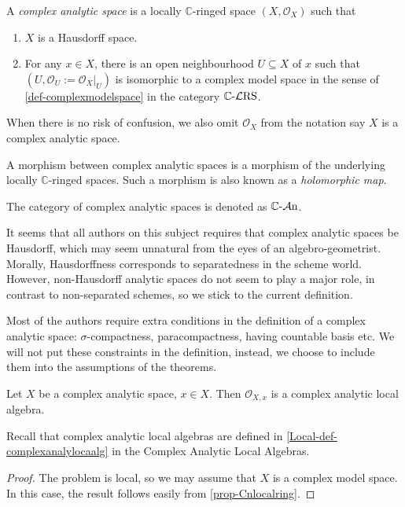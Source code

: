\begin{definition}\label{def-complexanalyticspace}
    A \emph{complex analytic space} is a locally $\mathbb{C}$-ringed space $(X,\mathcal{O}_X)$ such that 
    \begin{enumerate}
        \item $X$ is a Hausdorff space.
        \item For any $x\in X$, there is an open neighbourhood $U\subseteq X$ of $x$ such that $(U,\mathcal{O}_U:=\mathcal{O}_X|_U)$ is isomorphic to a complex model space in the sense of \cref{def-complexmodelspace} in the category $\mathbb{C}\text{-}\mathcal{L}\mathrm{RS}$.
    \end{enumerate}
    When there is no risk of confusion, we also omit $\mathcal{O}_X$ from the notation say $X$ is a complex analytic space.

    A morphism between complex analytic spaces is a morphism of the underlying locally $\mathbb{C}$-ringed spaces. Such a morphism is also known as a \emph{holomorphic map}.

    The category of complex analytic spaces is denoted as $\mathbb{C}\text{-}\mathcal{A}\mathrm{n}$.
\end{definition}
\begin{remark}
    It seems that all authors on this subject requires that complex analytic spaces be Hausdorff, which may seem unnatural from the eyes of an algebro-geometrist. Morally, Hausdorffness corresponds to separatedness in the scheme world. However, non-Hausdorff analytic spaces do not seem to play a major role, in contrast to non-separated schemes, so we stick to the current definition.
\end{remark}
\begin{remark}
    Most of the authors require extra conditions in the definition of a complex analytic space: $\sigma$-compactness, paracompactness, having countable basis etc. We will not put these constraints in the definition, instead, we choose to include them into the assumptions of the theorems.
\end{remark}

\begin{proposition}
    Let $X$ be a complex analytic space, $x\in X$. Then $\mathcal{O}_{X,x}$ is a complex analytic local algebra.
\end{proposition}
Recall that complex analytic local algebras are defined in \cref{Local-def-complexanalylocaalg} in the Complex Analytic Local Algebras.

\begin{proof}
    The problem is local, so we may assume that $X$ is a complex model space. In this case, the result follows easily from \cref{prop-Cnlocalring}.
\end{proof}

